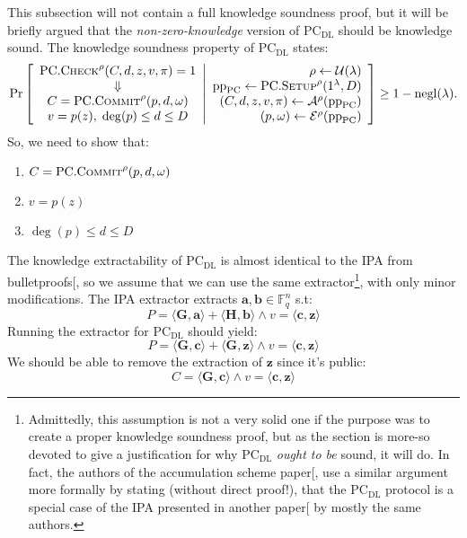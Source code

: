 \documentclass[
]{article}
\providecommand{\tightlist}{%
  \setlength{\itemsep}{0pt}\setlength{\parskip}{0pt}}
\newcommand*\Fb{\mathbb{F}}
\newcommand*\Ac{\mathcal{A}}
\newcommand*\Ec{\mathcal{E}}
\newcommand*\Uc{\mathcal{U}}
\renewcommand*\l{\lambda}
\renewcommand*\o{\omega}
\renewcommand{\vec}[1]{ \boldsymbol{#1} }
\newcommand{\ip}[2]{ \langle #1, #2 \rangle }
\newcommand*{\negl}{\text{negl}}
\newcommand*{\pp}{\mathrm{pp}}
\newcommand*{\Setup}{\mathrm{\text{S{\scriptsize ETUP}}}}
\newcommand*{\Commit}{\mathrm{\text{C{\scriptsize OMMIT}}}}
\newcommand*{\PC}{\text{PC}}
\newcommand*{\PCSetup}{\PC.\Setup}
\newcommand*{\PCCommit}{\PC.\Commit}
\newcommand*{\PCCheck}{\PC.\mathrm{\text{C\scriptsize HECK}}}
\newcommand*{\PCDL}{\text{PC}_{\text{DL}}}
\begin{document}
This subsection will not contain a full knowledge soundness proof, but
it will be briefly argued that the \emph{non-zero-knowledge} version of
\(\PCDL\) should be knowledge sound. The knowledge soundness property of
\(\PCDL\) states: \[
\Pr \left[
  \begin{array}{c}
    \PCCheck^\rho(C, d, z, v, \pi) = 1 \\
    \Downarrow \\
    C = \PCCommit^\rho(p, d, \o) \\
    v = p(z), \; \deg(p) \leq d \leq D
  \end{array}
  \middle|
  \begin{array}{r}
    \rho \leftarrow \Uc(\l) \\
    \pp_\PC \leftarrow \PCSetup^\rho(1^\l, D) \\
    (C, d, z, v, \pi) \leftarrow \Ac^\rho(\pp_\PC) \\
    (p, \o) \leftarrow \Ec^\rho(\pp_\PC) \\
  \end{array}
\right] \geq 1 - \negl(\lambda).
\] So, we need to show that:

\begin{enumerate}
\def\labelenumi{\arabic{enumi}.}
\tightlist
\item
  \(C = \PCCommit^\rho(p, d, \o)\)
\item
  \(v = p(z)\)
\item
  \(\deg(p) \leq d \leq D\)
\end{enumerate}

The knowledge extractability of \(\PCDL\) is almost identical to the IPA
from bulletproofs{[}\citeproc{ref-bulletproofs}{Bünz et al. 2017}{]}, so
we assume that we can use the same extractor\footnote{Admittedly, this
  assumption is not a very solid one if the purpose was to create a
  proper knowledge soundness proof, but as the section is more-so
  devoted to give a justification for why \(\PCDL\) \emph{ought to be}
  sound, it will do. In fact, the authors of the accumulation scheme
  paper{[}\citeproc{ref-pcd}{Bünz et al. 2020}{]}, use a similar
  argument more formally by stating (without direct proof!), that the
  \(\PCDL\) protocol is a special case of the IPA presented in another
  paper{[}\citeproc{ref-ipa}{Bünz et al. 2019}{]} by mostly the same
  authors.}, with only minor modifications. The IPA extractor extracts
\(\vec{a}, \vec{b} \in \Fb_q^n\) s.t:
\[P = \ip{\vec{G}}{\vec{a}} + \ip{\vec{H}}{\vec{b}} \land v = \ip{\vec{c}}{\vec{z}}\]
Running the extractor for \(\PCDL\) should yield:
\[P = \ip{\vec{G}}{\vec{c}} + \ip{\vec{G}}{\vec{z}} \land v = \ip{\vec{c}}{\vec{z}}\]
We should be able to remove the extraction of \(\vec{z}\) since it's
public: \[C = \ip{\vec{G}}{\vec{c}} \land v = \ip{\vec{c}}{\vec{z}}\]
\end{document}
